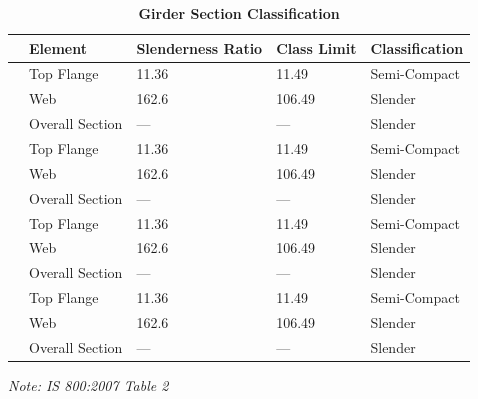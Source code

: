\documentclass[12pt,a4paper]{report}
\numberwithin{table}{chapter}
\numberwithin{figure}{chapter}
\begin{document}
\vspace{1em}
\begin{longtable}{|C{2.5cm}|L{3cm}|C{3.5cm}|C{2.5cm}|>{\centering\arraybackslash}p{4.0cm}|}
\caption{\textbf{Girder Section Classification}}
\hline
\textbf{} & \textbf{Element} & \textbf{Slenderness Ratio} & \textbf{Class Limit} & \textbf{Classification} \\[6pt]
\hline
{} & Top Flange & 11.36 & 11.49 & Semi-Compact \\[6pt]
 & Web & 162.6 & 106.49 & Slender \\[6pt]
 & Overall Section & --- & --- & Slender \\[6pt]
\hline
{} & Top Flange & 11.36 & 11.49 & Semi-Compact \\[6pt]
 & Web & 162.6 & 106.49 & Slender \\[6pt]
 & Overall Section & --- & --- & Slender \\[6pt]
\hline
{} & Top Flange & 11.36 & 11.49 & Semi-Compact \\[6pt]
 & Web & 162.6 & 106.49 & Slender \\[6pt]
 & Overall Section & --- & --- & Slender \\[6pt]
\hline
{} & Top Flange & 11.36 & 11.49 & Semi-Compact \\[6pt]
 & Web & 162.6 & 106.49 & Slender \\[6pt]
 & Overall Section & --- & --- & Slender \\[6pt]
\hline
\end{longtable}
\noindent\textit{Note: IS 800:2007 Table 2}
\end{document}
